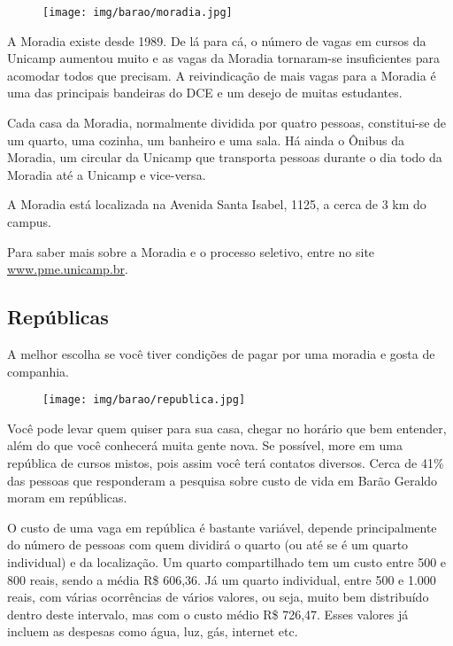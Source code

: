 \begin{figure}[h!]
    \centering
    \texttt{[image: img/barao/moradia.jpg]}
\end{figure}

A Moradia existe desde 1989. De lá para cá, o número de vagas em cursos da
Unicamp aumentou muito e as vagas da Moradia tornaram-se insuficientes para
acomodar todos que precisam. A reivindicação de mais vagas para a Moradia é uma
das principais bandeiras do DCE e um desejo de muitas estudantes.

Cada casa da Moradia, normalmente dividida por quatro pessoas, constitui-se de
um quarto, uma cozinha, um banheiro e uma sala. Há ainda o Ônibus da Moradia,
um circular da Unicamp que transporta pessoas durante o dia todo da Moradia até
a Unicamp e vice-versa.

A Moradia está localizada na Avenida Santa Isabel, 1125, a cerca de 3 km do
campus.

Para saber mais sobre a Moradia e o processo seletivo, entre no site
\url{www.pme.unicamp.br}.

\subsection{Repúblicas}

A melhor escolha se você tiver condições de pagar por uma moradia e gosta de
companhia.

\begin{figure}[h!]
    \centering
    \texttt{[image: img/barao/republica.jpg]}
\end{figure}

Você pode levar quem quiser para sua casa, chegar no horário que bem entender,
além do que você conhecerá muita gente nova. Se possível, more em uma república
de cursos mistos, pois assim você terá contatos diversos. Cerca de 41\% das
pessoas que responderam a pesquisa sobre custo de vida em Barão Geraldo moram
em repúblicas.

O custo de uma vaga em república é bastante variável, depende principalmente do
número de pessoas com quem dividirá o quarto (ou até se é um quarto individual)
e da localização. Um quarto compartilhado tem um custo entre 500 e 800 reais,
sendo a média R\$ 606,36. Já um quarto individual, entre 500 e 1.000 reais,
com várias ocorrências de vários valores, ou seja, muito bem distribuído dentro
deste intervalo, mas com o custo médio R\$ 726,47. Esses valores já incluem as
despesas como água, luz, gás, internet etc.

